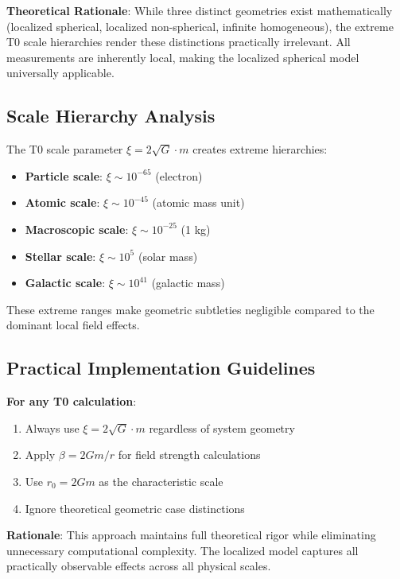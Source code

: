 \documentclass[12pt,a4paper]{article}
\begin{document}
	\textbf{Theoretical Rationale}: While three distinct geometries exist mathematically (localized spherical, localized non-spherical, infinite homogeneous), the extreme T0 scale hierarchies render these distinctions practically irrelevant. All measurements are inherently local, making the localized spherical model universally applicable.
	
	\subsection{Scale Hierarchy Analysis}
	\label{subsec:scale_hierarchy}
	
	The T0 scale parameter $\xi = 2\sqrt{G} \cdot m$ creates extreme hierarchies:
	
	\begin{itemize}
		\item \textbf{Particle scale}: $\xi \sim 10^{-65}$ (electron)
		\item \textbf{Atomic scale}: $\xi \sim 10^{-45}$ (atomic mass unit)
		\item \textbf{Macroscopic scale}: $\xi \sim 10^{-25}$ (1 kg)
		\item \textbf{Stellar scale}: $\xi \sim 10^{5}$ (solar mass)
		\item \textbf{Galactic scale}: $\xi \sim 10^{41}$ (galactic mass)
	\end{itemize}
	
	These extreme ranges make geometric subtleties negligible compared to the dominant local field effects.
	
	\subsection{Practical Implementation Guidelines}
	\label{subsec:implementation_guidelines}
	
	\textbf{For any T0 calculation}:
	\begin{enumerate}
		\item Always use $\xi = 2\sqrt{G} \cdot m$ regardless of system geometry
		\item Apply $\beta = 2Gm/r$ for field strength calculations
		\item Use $r_0 = 2Gm$ as the characteristic scale
		\item Ignore theoretical geometric case distinctions
	\end{enumerate}
	
	\textbf{Rationale}: This approach maintains full theoretical rigor while eliminating unnecessary computational complexity. The localized model captures all practically observable effects across all physical scales.
	
\end{document}
